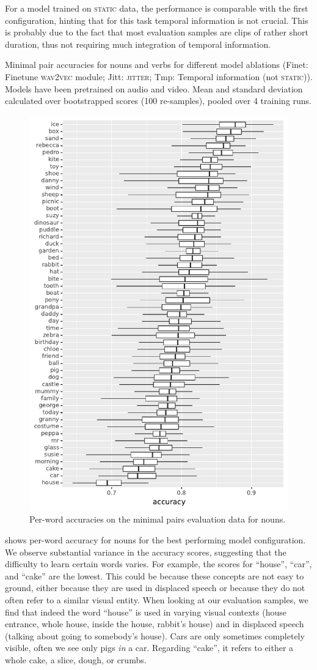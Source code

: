 For a model trained on \textsc{static} data, the performance is comparable with 
the first configuration, hinting that for this task temporal information is not 
crucial. This is probably due to the fact that most evaluation samples are 
clips of rather short duration, thus not requiring much integration of 
temporal information.
\begin{table}[htb]
	
	\caption{Minimal pair accuracies for nouns and verbs for different model 
		ablations (Finet: Finetune \textsc{wav2vec} module; 
		Jitt: \textsc{jitter}; Tmp: Temporal information (not \textsc{static})). 
		Models have been pretrained on audio and video. Mean and standard 
		deviation calculated over bootstrapped scores (100 re-samples), pooled 
		over 4 training runs.}
	\label{tab:minimal_pair_results}
\end{table}


\begin{figure}[htb]
  \centering
  \includegraphics[width=.5\textwidth]{results/targeted_triplets/acc_per_word_NOUN.pdf}
  \caption{Per-word accuracies on the minimal pairs evaluation data for nouns.}
  \label{fig:accuracy_targeted_triplets_nouns}
\end{figure}

 shows per-word
accuracy for nouns for the best performing model configuration.
We observe substantial variance in the accuracy scores, suggesting that the 
difficulty to learn certain words varies. For example, the 
scores for ``house'', ``car'', and ``cake'' are the lowest. This could be 
because these concepts are not easy to ground, either because they are used in 
displaced speech or because they do not often refer to a similar visual entity. 
When looking at our evaluation samples, we find that indeed the word ``house'' 
is used in varying visual contexts (house entrance, whole house, inside the
house, rabbit's house) and in displaced speech (talking about going 
to somebody's house). Cars are only sometimes completely visible, often we see 
only pigs \textit{in} a car. Regarding ``cake'', it refers to either a 
whole cake, a slice, dough, or crumbs.

